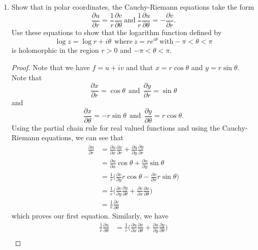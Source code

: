 \documentclass[11pt,a4paper]{book}
\begin{document}
\begin{enumerate}
\begin{proof}
    \end{proof}
    \item Show that in polar coordinates, the Cauchy-Riemann equations take the form 
        \[  \frac{ \partial u  }{ \partial r  }  = \frac{ 1 }{ r }  \frac{ \partial v   }{ \partial \theta } \ \text{and} \ \frac{ 1 }{ r }  \frac{ \partial u  }{  \partial \theta  }  = - \frac{ \partial v  }{  \partial r  }.  \]
        Use these equations to show that the logarithm function defined by
        \[  \log z = \log r + i \theta \ \ \text{where} \ z = r e^{i \theta} \ \text{with} - \pi < \theta < \pi    \]
        is holomorphic in the region \( r > 0  \) and \( - \pi < \theta < \pi \).
        \begin{proof}
        Note that we have \( f = u + iv    \) and that \( x = r \cos \theta  \) and \( y = r \sin \theta \). Note that  
        \[  \frac{\partial x }{\partial r  }  = \cos \theta \ \ \text{and} \ \ \frac{\partial y }{\partial r }  = \sin \theta   \]
        and
        \[  \frac{\partial x }{\partial \theta  }  = -r \sin \theta \ \ \text{and} \ \ \frac{\partial y }{\partial \theta  } = r \cos \theta.   \]
        Using the partial chain rule for real valued functions and using the Cauchy-Riemann equations, we can see that
        \begin{align*}  \frac{\partial u  }{\partial  r  }  &= \frac{\partial u }{\partial x  }  \frac{\partial x  }{\partial r  }  + \frac{\partial u  }{\partial y }  \frac{\partial y }{\partial r  } \\ 
            &= \frac{\partial u }{\partial x }  \cos \theta + \frac{\partial u }{\partial y }  \sin \theta  \\
            &= \frac{ 1 }{ r } \Big(   \frac{\partial v }{\partial y }   r \cos \theta - \frac{\partial v   }{\partial x  }  r \sin \theta \Big) \\
            &= \frac{ 1 }{ r }  \Big(  \frac{\partial v }{\partial y }  \frac{\partial y }{\partial \theta  }  + \frac{\partial v }{\partial x }  \frac{\partial x  }{\partial \theta  }  \Big) \\ 
            &= \frac{ 1 }{ r } \frac{\partial v }{\partial \theta  }
        \end{align*}
        which proves our first equation. Similarly, we have 
        \begin{align*}
            \frac{ 1 }{ r }  \frac{\partial u }{\partial \theta  }  &= \frac{ 1 }{ r }  \Big(  \frac{\partial u }{\partial x  }  \frac{\partial x  }{\partial  \theta  }  + \frac{\partial u }{\partial y }  \frac{\partial y }{\partial \theta  }  \Big) \\

\end{align*}
\end{proof}
\end{enumerate}
\end{document}
